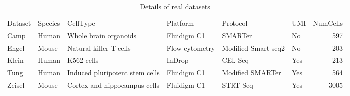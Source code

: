 \begin{table}
\caption{\label{tab:datasets}Details of real datasets}
\begin{tabular}[t]{l|l|l|l|l|l|r}
Dataset & Species & CellType & Platform & Protocol & UMI & NumCells\\
Camp & Human & Whole brain organoids & Fluidigm C1 & SMARTer & No & 597\\
Engel & Mouse & Natural killer T cells & Flow cytometry & Modified Smart-seq2 & No & 203\\
Klein & Human & K562 cells & InDrop & CEL-Seq & Yes & 213\\
Tung & Human & Induced pluripotent stem cells & Fluidigm C1 & Modified SMARTer & Yes & 564\\
Zeisel & Mouse & Cortex and hippocampus cells & Fluidigm C1 & STRT-Seq & Yes & 3005\\
\end{tabular}
\end{table}